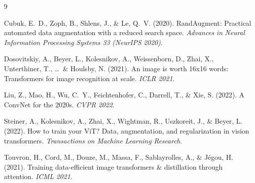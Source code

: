\documentclass{article}
\begin{document}
{\small

\begin{thebibliography}{9}

Cubuk, E.~D., Zoph, B., Shlens, J., \& Le, Q.~V. (2020).
\newblock RandAugment: Practical automated data augmentation with a reduced search space.
\newblock \textit{Advances in Neural Information Processing Systems 33 (NeurIPS 2020)}.

Dosovitskiy, A., Beyer, L., Kolesnikov, A., Weissenborn, D., Zhai, X., Unterthiner, T., \ldots\ \& Houlsby, N. (2021).
\newblock An image is worth 16x16 words: Transformers for image recognition at scale.
\newblock \textit{ICLR 2021}.

Liu, Z., Mao, H., Wu, C.~Y., Feichtenhofer, C., Darrell, T., \& Xie, S. (2022).
\newblock A ConvNet for the 2020s.
\newblock \textit{CVPR 2022}.

Steiner, A., Kolesnikov, A., Zhai, X., Wightman, R., Uszkoreit, J., \& Beyer, L. (2022).
\newblock How to train your ViT? Data, augmentation, and regularization in vision transformers.
\newblock \textit{Transactions on Machine Learning Research}.

Touvron, H., Cord, M., Douze, M., Massa, F., Sablayrolles, A., \& J\'egou, H. (2021).
\newblock Training data-efficient image transformers \& distillation through attention.
\newblock \textit{ICML 2021}.

\end{thebibliography}
}
\end{document}

